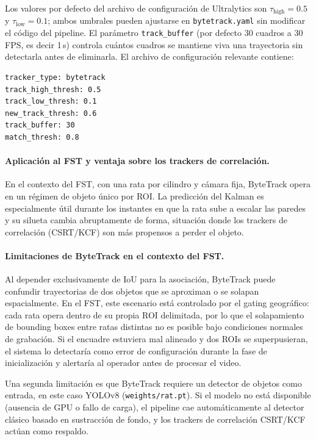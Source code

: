 Los valores por defecto del archivo de configuración de Ultralytics
\cite{ultralytics_bytetrack_yaml} son $\tau_\text{high} = 0.5$ y
$\tau_\text{low} = 0.1$; ambos umbrales pueden ajustarse en
\texttt{bytetrack.yaml} sin modificar el código del pipeline. El parámetro
\texttt{track\_buffer} (por defecto 30 cuadros a 30\,FPS, es decir 1\,s)
controla cuántos cuadros se mantiene viva una trayectoria sin detectarla
antes de eliminarla. El archivo de configuración relevante contiene:

\begin{verbatim}
tracker_type: bytetrack
track_high_thresh: 0.5
track_low_thresh: 0.1
new_track_thresh: 0.6
track_buffer: 30
match_thresh: 0.8
\end{verbatim}

\paragraph{Aplicación al FST y ventaja sobre los trackers de correlación.}
En el contexto del FST, con una rata por cilindro y cámara fija, ByteTrack
opera en un régimen de objeto único por ROI. La predicción del Kalman es
especialmente útil durante los instantes en que la rata sube a escalar las
paredes y su silueta cambia abruptamente de forma, situación donde los
trackers de correlación (CSRT/KCF) son más propensos a perder el objeto.

\paragraph{Limitaciones de ByteTrack en el contexto del FST.}
Al depender exclusivamente de IoU para la asociación, ByteTrack puede
confundir trayectorias de dos objetos que se aproximan o se solapan
espacialmente. En el FST, este escenario está controlado por el gating
geográfico: cada rata opera dentro de su propia ROI delimitada, por lo
que el solapamiento de bounding boxes entre ratas distintas no es posible
bajo condiciones normales de grabación. Si el encuadre estuviera mal
alineado y dos ROIs se superpusieran, el sistema lo detectaría como error de
configuración durante la fase de inicialización y alertaría al operador antes
de procesar el video.

Una segunda limitación es que ByteTrack requiere un detector de objetos como
entrada, en este caso YOLOv8 (\texttt{weights/rat.pt}). Si el modelo no está
disponible (ausencia de GPU o fallo de carga), el pipeline cae
automáticamente al detector clásico basado en sustracción de fondo, y los
trackers de correlación CSRT/KCF actúan como respaldo.


